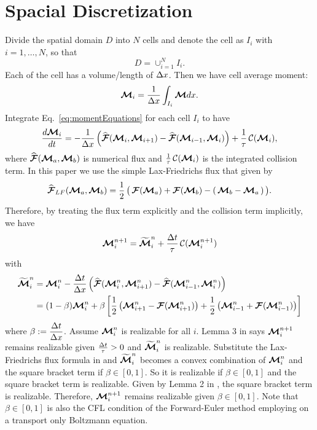 \section{Spacial Discretization}\label{se:SpacialDiscretization}

Divide the spatial domain $D$ into $N$ cells and denote the cell as $I_{i}$ with $i = 1,\ldots,N$, so that
\begin{equation*}
D = \cup_{i = 1}^{N} I_{i}.
\end{equation*}
Each of the cell has a volume/length of $\Delta x$.
Then we have cell average moment:
\begin{equation}
\boldsymbol{\mathcal{M}}_{i} = \dfrac{1}{\Delta x} \int_{I_i}\boldsymbol{\mathcal{M}} dx.
\end{equation}
Integrate Eq.~\eqref{eq:momentEquations} for each cell $I_{i}$ to have
\begin{equation}
\dfrac{d \boldsymbol{\mathcal{M}}_{i}}{d t} = - \dfrac{1}{\Delta x} \left( \widehat{\boldsymbol{\mathcal{F}}}(\boldsymbol{\mathcal{M}}_{i},\boldsymbol{\mathcal{M}}_{i+1}) -  \widehat{\boldsymbol{\mathcal{F}}}(\boldsymbol{\mathcal{M}}_{i-1},\boldsymbol{\mathcal{M}}_{i})\right) + \frac{1}{\tau}\,\mathcal{C}(\boldsymbol{\mathcal{M}}_{i}),
\end{equation}
where $\widehat{\boldsymbol{\mathcal{F}}}(\boldsymbol{\mathcal{M}}_{a},\boldsymbol{\mathcal{M}}_{b})$ is numerical flux and $\frac{1}{\tau}\,\mathcal{C}(\boldsymbol{\mathcal{M}}_{i})$ is the integrated collision term.
In this paper we use the simple Lax-Friedrichs flux that given by
\begin{equation}
  \widehat{\boldsymbol{\mathcal{F}}}_{LF}(\boldsymbol{\mathcal{M}}_{a},\boldsymbol{\mathcal{M}}_{b})
  =\frac{1}{2}\,\big(\,\boldsymbol{\mathcal{F}}(\boldsymbol{\mathcal{M}}_{a})+\boldsymbol{\mathcal{F}}(\boldsymbol{\mathcal{M}}_{b})-(\,\boldsymbol{\mathcal{M}}_{b}-\boldsymbol{\mathcal{M}}_{a}\,)\,\big).
\end{equation}
Therefore, by treating the flux term explicitly and the collision term implicitly, we have
\begin{align*}
\boldsymbol{\mathcal{M}}_{i}^{n+1} = \widetilde{\boldsymbol{\mathcal{M}}}^{n}_{i} + \frac{\Delta t}{\tau}\,\mathcal{C}(\boldsymbol{\mathcal{M}}^{n+1}_{i})
\end{align*}
with
\begin{align*}
\widetilde{\boldsymbol{\mathcal{M}}}^{n}_{i} 
& = \boldsymbol{\mathcal{M}}_{i}^{n} - \dfrac{\Delta t}{\Delta x} \left( \widehat{\boldsymbol{\mathcal{F}}}(\boldsymbol{\mathcal{M}}^{n}_{i},\boldsymbol{\mathcal{M}}^{n}_{i+1}) -  \widehat{\boldsymbol{\mathcal{F}}}(\boldsymbol{\mathcal{M}}^{n}_{i-1},\boldsymbol{\mathcal{M}}^{n}_{i})\right)\nonumber \\
& = (1-\beta)\boldsymbol{\mathcal{M}}_{i}^{n} + \beta\left[ \frac{1}{2}\left( \boldsymbol{\mathcal{M}}^{n}_{i+1}-\boldsymbol{\mathcal{F}}(\boldsymbol{\mathcal{M}}^{n}_{i+1})\right)  + \frac{1}{2}\left( \boldsymbol{\mathcal{M}}^{n}_{i-1}+\boldsymbol{\mathcal{F}}(\boldsymbol{\mathcal{M}}^{n}_{i-1})\right)\right]
\end{align*}
where $\beta := \dfrac{\Delta t}{\Delta x}$.
Assume $\boldsymbol{\mathcal{M}}_{i}^{n}$ is realizable for all $i$. 
Lemma 3 in \cite{chu_2018} says $\boldsymbol{\mathcal{M}}^{n+1}_{i}$ remains realizable given $\frac{\Delta t}{\tau} > 0$ and $\widetilde{\boldsymbol{\mathcal{M}}}^{n}_{i}$ is realizable.
Substitute the Lax-Friedrichs flux formula in and $\widetilde{\boldsymbol{\mathcal{M}}}^{n}_{i}$ becomes a convex combination of $\boldsymbol{\mathcal{M}}_{i}^{n}$ and the square bracket term if $\beta \in [0,1]$.
So it is realizable if $\beta \in [0,1]$ and the square bracket term is realizable.
Given by Lemma 2 in \cite{chu_2018}, the square bracket term is realizable.
Therefore, $\boldsymbol{\mathcal{M}}^{n+1}_{i}$ remains realizable given $\beta \in [0,1]$.
Note that $\beta \in [0,1]$ is also the CFL condition of the Forward-Euler method employing on a transport only Boltzmann equation.
